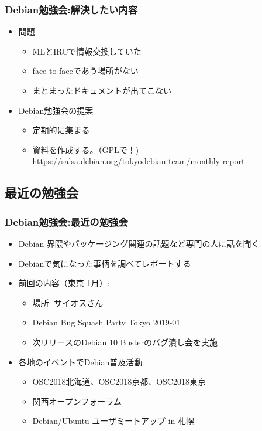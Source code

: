 \begin{frame}

\frametitle{Debian勉強会:解決したい内容}
\begin{itemize}
 \item<1-> 問題
       \begin{itemize}
	\item MLとIRCで情報交換していた
	\item face-to-faceであう場所がない
	\item まとまったドキュメントが出てこない
       \end{itemize}
 \item<2-> Debian勉強会の提案
       \begin{itemize}
	\item 定期的に集まる
	\item 資料を作成する。（GPLで！) \\
	  {\small \url{https://salsa.debian.org/tokyodebian-team/monthly-report}}
       \end{itemize}
\end{itemize}

\end{frame}


\subsection{最近の勉強会}


\begin{frame}
  
\frametitle{Debian勉強会:最近の勉強会}
  
\begin{itemize}
  \item Debian 界隈やパッケージング関連の話題など専門の人に話を聞く
  \item Debianで気になった事柄を調べてレポートする
  \item 前回の内容（東京 1月）:
	\begin{itemize}
	\item 場所: サイオスさん
    \item Debian Bug Squash Party Tokyo 2019-01
    \item 次リリースのDebian 10 Busterのバグ潰し会を実施
	\end{itemize}
  \item 各地のイベントでDebian普及活動
	\begin{itemize}
      \item OSC2018北海道、OSC2018京都、OSC2018東京
      \item 関西オープンフォーラム
	  \item Debian/Ubuntu ユーザミートアップ in 札幌
	\end{itemize}
\end{itemize}

\end{frame}

